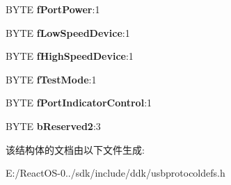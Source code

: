 \begin{DoxyCompactItemize}
B\+Y\+TE {\bfseries f\+Port\+Power}\+:1
\item 
\mbox{\label{struct___u_s_b_h_u_b_p_o_r_t_s_t_a_t_u_s_1_1_bits_a1d3f4b740a09282c9c40a63ec2e356dc}} 
B\+Y\+TE {\bfseries f\+Low\+Speed\+Device}\+:1
\item 
\mbox{\label{struct___u_s_b_h_u_b_p_o_r_t_s_t_a_t_u_s_1_1_bits_a9943a9f448a8d7e700dd98c9442892a8}} 
B\+Y\+TE {\bfseries f\+High\+Speed\+Device}\+:1
\item 
\mbox{\label{struct___u_s_b_h_u_b_p_o_r_t_s_t_a_t_u_s_1_1_bits_a63bd5460b6951726179f33fc688639af}} 
B\+Y\+TE {\bfseries f\+Test\+Mode}\+:1
\item 
\mbox{\label{struct___u_s_b_h_u_b_p_o_r_t_s_t_a_t_u_s_1_1_bits_a34b31a11a8281e66cb7f9d4de3520f9a}} 
B\+Y\+TE {\bfseries f\+Port\+Indicator\+Control}\+:1
\item 
\mbox{\label{struct___u_s_b_h_u_b_p_o_r_t_s_t_a_t_u_s_1_1_bits_a3eb8253b417f2da186798ccc626e2ea5}} 
B\+Y\+TE {\bfseries b\+Reserved2}\+:3
\end{DoxyCompactItemize}


该结构体的文档由以下文件生成\+:\begin{DoxyCompactItemize}
\item 
E\+:/\+React\+O\+S-\/0../sdk/include/ddk/usbprotocoldefs.\+h\end{DoxyCompactItemize}
